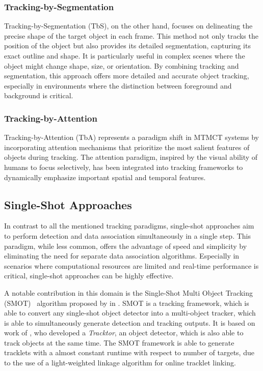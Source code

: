 \subsubsection{Tracking-by-Segmentation}\label{subsubsec:tracking-by-segmentation}
Tracking-by-Segmentation (TbS), on the other hand, focuses on delineating the precise shape of the target object in each frame. This method not only tracks the position of the object but also provides its detailed segmentation, capturing its exact outline and shape. It is particularly useful in complex scenes where the object might change shape, size, or orientation. By combining tracking and segmentation, this approach offers more detailed and accurate object tracking, especially in environments where the distinction between foreground and background is critical.

\subsubsection{Tracking-by-Attention}\label{subsubsec:tracking_by_attention}Tracking-by-Attention (TbA) represents a paradigm shift in MTMCT systems by incorporating attention mechanisms that prioritize the most salient features of objects during tracking. The attention paradigm, inspired by the visual ability of humans to focus selectively, has been integrated into tracking frameworks to dynamically emphasize important spatial and temporal features.

\subsection{Single-Shot Approaches}\label{subsec:single-shot_approaches}
In contrast to all the mentioned tracking paradigms, single-shot approaches aim to perform detection and data association simultaneously in a single step. This paradigm, while less common, offers the advantage of speed and simplicity by eliminating the need for separate data association algorithms. Especially in scenarios where computational resources are limited and real-time performance is critical, single-shot approaches can be highly effective.

A notable contribution in this domain is the Single-Shot Multi Object Tracking (SMOT)~\cite{Li20} algorithm proposed by \citeauthor{Li20} in \citeyear{Li20}. SMOT is a tracking framework, which is able to convert any single-shot object detector into a multi-object tracker, which is able to simultaneously generate detection and tracking outputs. It is based on work of \textcite{Bergmann19}, who developed a \textit{Tracktor}, an object detector, which is also able to track objects at the same time. The SMOT framework is able to generate tracklets with a almost constant runtime with respect to number of targets, due to the use of a light-weighted linkage algorithm for online tracklet linking.

